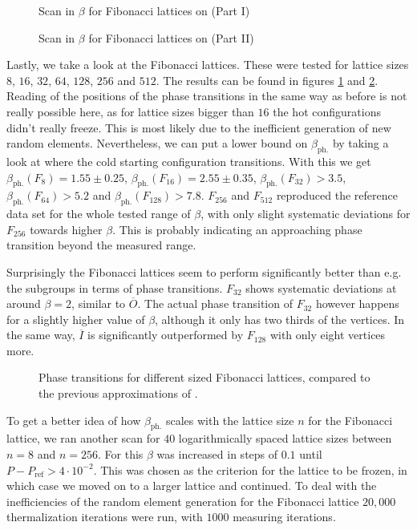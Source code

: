 \begin{figure}[!hbt]
 \centering
 
 \caption{Scan in $\beta$ for Fibonacci lattices on \SUTwo (Part I)}
 \label{plot:fibonacciI}
\end{figure}
\begin{figure}[!hbt]
 \centering
 
 \caption{Scan in $\beta$ for Fibonacci lattices on \SUTwo (Part II)}
 \label{plot:fibonacciII}
\end{figure}

Lastly, we take a look at the Fibonacci lattices. These were tested for lattice sizes  $8$, $16$, $32$, $64$, $128$, $256$ and $512$. The results can be found in figures \ref{plot:fibonacciI} and \ref{plot:fibonacciII}. Reading of the positions of the phase transitions in the same way as before is not really possible here, as for lattice sizes bigger than $16$ the hot configurations didn't really freeze. This is most likely due to the inefficient generation of new random elements. Nevertheless, we can put a lower bound on $\beta_{\textrm{ph.}}$ by taking a look at where the cold starting configuration transitions. With this we get $\beta_{\textrm{ph.}}(F_8) = 1.55 \pm 0.25$, $\beta_{\textrm{ph.}}(F_16) = 2.55 \pm 0.35 $, $\beta_{\textrm{ph.}}(F_{32}) > 3.5 $, $\beta_{\textrm{ph.}}(F_{64}) > 5.2 $ and $\beta_{\textrm{ph.}}(F_{128}) > 7.8$. $F_{256}$ and $F_{512}$ reproduced the reference data set for the whole tested range of $\beta$, with only slight systematic deviations for $F_{256}$ towards higher $\beta$. This is probably indicating an approaching phase transition beyond the measured range.

Surprisingly the Fibonacci lattices seem to perform significantly better than e.g. the subgroups in terms of phase transitions. $F_{32}$ shows systematic deviations at around $\beta = 2$, similar to $\overline{O}$. The actual phase transition of $F_{32}$ however happens for a slightly higher value of $\beta$, although it only has two thirds of the vertices. In the same way, $\overline{I}$ is significantly outperformed by $F_{128}$ with only eight vertices more. \\

\begin{figure}[!hbt]
 \centering
 
 \caption{Phase transitions for different sized Fibonacci lattices, compared to the previous approximations of \SUTwo.}
 \label{plot:fibPhaseScan}
\end{figure}

To get a better idea of how $\beta_{\textrm{ph.}}$ scales with the lattice size $n$ for the Fibonacci lattice, we ran another scan for $40$ logarithmically spaced lattice sizes between $n=8$ and $n=256$. For this $\beta$ was increased in steps of $0.1$ until $P-P_{\textrm{ref}} > 4 \cdot 10^{-2}$. This was chosen as the criterion for the lattice to be frozen, in which case we moved on to a larger lattice and continued. To deal with the inefficiencies of the random element generation for the Fibonacci lattice $20,000$ thermalization iterations were run, with $1000$ measuring iterations.


